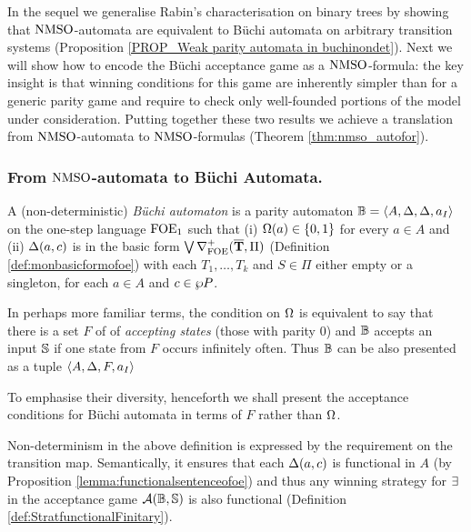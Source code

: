 In the sequel we generalise Rabin's characterisation on binary trees \cite{Rab70} by showing that $\mathrm{NMSO}$-automata are equivalent to B\"{u}chi automata on arbitrary transition systems (Proposition \ref{PROP_Weak parity automata in buchinondet}). Next we will show how to encode the B\"{u}chi acceptance game as a $\mathrm{NMSO}$-formula: the key insight is that winning conditions for this game are inherently simpler than for a generic parity game and require to check only well-founded portions of the model under consideration. Putting together these two results we achieve a translation from $\mathrm{NMSO}$-automata to $\mathrm{NMSO}$-formulas (Theorem \ref{thm:nmso_autofor}).

\subsubsection{From $\mathrm{NMSO}$-automata to B\"{u}chi Automata.}


\begin{definition} A (non-deterministic) \emph{B\"{u}chi automaton} is a parity automaton $\mathbb{B} = \langle{A,\Delta,\Delta,a_I}\rangle$ on the one-step language $\mathrm{FOE}_1$ such that (i) $\Omega(a) \in \{0,1\}$ for every $a \in A$ and (ii) $\Delta(a,c)$ is in the basic form $\bigvee \nabla^+_{\mathrm{FOE}}(\overline{{\mathbf{T}}},\Pi)$ (Definition \ref{def:monbasicformofoe}) with each $T_1,\dots,T_k$ and $S \in \Pi$ either empty or a singleton, for each $a \in A$  and $c \in \wp P$. 

In perhaps more familiar terms, the condition on $\Omega$ is equivalent to say that there is a set $F$ of  of \emph{accepting states} (those with parity $0$) and $\mathbb{B}$ accepts an input $\mathbb{S}$ if one state from $F$ occurs infinitely often. Thus $\mathbb{B}$ can be also presented as a tuple $\langle{A,\Delta,F,a_I}\rangle$
\end{definition}

To emphasise their diversity, henceforth we shall present the acceptance conditions for B\"{u}chi automata in terms of $F$ rather than $\Omega$. 

\begin{remark} \label{rmk:Buchifunctional}
Non-determinism in the above definition is expressed by the requirement on the transition map. Semantically, it ensures that each $\Delta(a,c)$ is functional in $A$ (by Proposition \ref{lemma:functionalsentenceofoe}) and thus any winning strategy for $\exists$ in the acceptance game $\mathcal{A}(\mathbb{B},\mathbb{S})$ is also functional (Definition \ref{def:StratfunctionalFinitary}).\end{remark}


